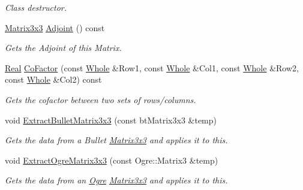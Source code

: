 \begin{DoxyCompactItemize}
\begin{DoxyCompactList}\small\item\em Class destructor. \item\end{DoxyCompactList}\item 
\hyperlink{classMezzanine_1_1Matrix3x3}{Matrix3x3} \hyperlink{classMezzanine_1_1Matrix3x3_a50d4faf2eba601a188296922c95d96fe}{Adjoint} () const 
\begin{DoxyCompactList}\small\item\em Gets the Adjoint of this Matrix. \item\end{DoxyCompactList}\item 
\hyperlink{namespaceMezzanine_a726731b1a7df72bf3583e4a97282c6f6}{Real} \hyperlink{classMezzanine_1_1Matrix3x3_a42d3e09c193cf18b6cd9d47523ab45d2}{CoFactor} (const \hyperlink{namespaceMezzanine_adcbb6ce6d1eb4379d109e51171e2e493}{Whole} \&Row1, const \hyperlink{namespaceMezzanine_adcbb6ce6d1eb4379d109e51171e2e493}{Whole} \&Col1, const \hyperlink{namespaceMezzanine_adcbb6ce6d1eb4379d109e51171e2e493}{Whole} \&Row2, const \hyperlink{namespaceMezzanine_adcbb6ce6d1eb4379d109e51171e2e493}{Whole} \&Col2) const 
\begin{DoxyCompactList}\small\item\em Gets the cofactor between two sets of rows/columns. \item\end{DoxyCompactList}\item 
void \hyperlink{classMezzanine_1_1Matrix3x3_a83e2eb18dffde54925227d28adebf15a}{ExtractBulletMatrix3x3} (const btMatrix3x3 \&temp)
\begin{DoxyCompactList}\small\item\em Gets the data from a Bullet \hyperlink{classMezzanine_1_1Matrix3x3}{Matrix3x3} and applies it to this. \item\end{DoxyCompactList}\item 
void \hyperlink{classMezzanine_1_1Matrix3x3_a11cf9a00709f0abb52949c2dbbf9efde}{ExtractOgreMatrix3x3} (const Ogre::Matrix3 \&temp)
\begin{DoxyCompactList}\small\item\em Gets the data from an \hyperlink{namespaceOgre}{Ogre} \hyperlink{classMezzanine_1_1Matrix3x3}{Matrix3x3} and applies it to this. \item\end{DoxyCompactList}\item 

\end{DoxyCompactItemize}
